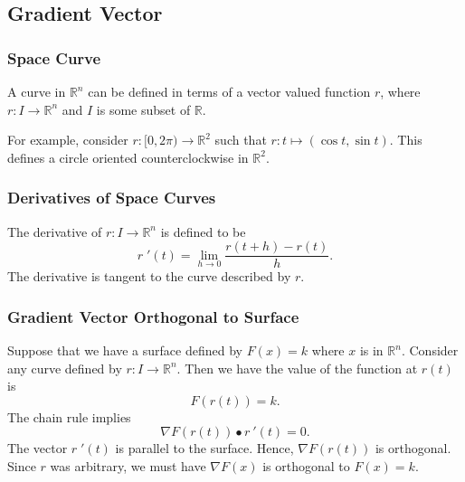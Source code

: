 \documentclass{beamer}
\begin{document}
\subsection{Gradient Vector}
\begin{frame}
\frametitle{Space Curve}
A curve in $\mathbb{R}^n$ can be defined in terms of a vector valued function $r$, where $r:I\to\mathbb{R}^n$ and $I$ is some subset of $\mathbb{R}$. 

For example, consider $r:[0, 2\pi)\to\mathbb{R}^2$ such that $r: t \mapsto \left(\cos t, \sin t\right)$. This defines a circle oriented counterclockwise in $\mathbb{R}^2$.
\begin{center}

\end{center}
\end{frame} 

\begin{frame}[t]
\frametitle{Derivatives of Space Curves}
The derivative of $r:I\to\mathbb{R}^n$ is defined to be
$$
r\; '(t) =\lim_{h\to 0} \frac{r(t + h) - r(t)}{h}.
$$
The derivative is tangent to the curve described by $r$.
\end{frame}

\begin{frame}
\frametitle{Gradient Vector Orthogonal to Surface}
\small 
Suppose that we have a surface defined by $F(x) = k$ where $x$ is in $\mathbb{R}^n$. Consider any curve defined by $r: I\to \mathbb{R}^n$. Then we have the value of the function at $r(t)$ is
$$
F(r(t)) = k.
$$
The chain rule implies
$$
\nabla F(r(t))\bullet r\ '(t) = 0.
$$
The vector $r\; '(t)$ is parallel to the surface. Hence, $\nabla F(r(t))$ is orthogonal. Since $r$ was arbitrary, we must have $\nabla F(x)$ is orthogonal to $F(x) = k$.
\end{frame}
\end{document}
